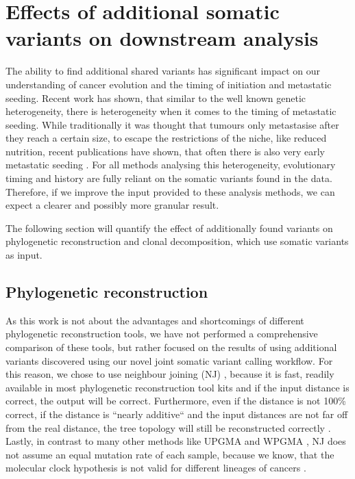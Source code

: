 \section[Effects on downstream analysis]{Effects of additional somatic variants on downstream analysis}
\label{variantcalling-sec:downstream}

The ability to find additional shared variants has significant impact on our understanding of cancer evolution and the timing of initiation and metastatic seeding. Recent work has shown, that similar to the well known genetic heterogeneity, there is heterogeneity when it comes to the timing of metastatic seeding. While traditionally it was thought that tumours only metastasise after they reach a certain size, to escape the restrictions of the niche, like reduced nutrition, recent publications have shown, that often there is also very early metastatic seeding \cite{Hu2019}. 
For all methods analysing this heterogeneity, evolutionary timing and history are fully reliant on the somatic variants found in the data. Therefore, if we improve the input provided to these analysis methods, we can expect a clearer and possibly more granular result.

The following section will quantify the effect of additionally found variants on phylogenetic reconstruction and clonal decomposition, which use somatic variants as input.


\subsection[Phylogenetic reconstruction]{Phylogenetic reconstruction}
\label{variantcalling-sec:phylo}
As this work is not about the advantages and shortcomings of different phylogenetic reconstruction tools, we have not performed a comprehensive comparison of these tools, but rather focused on the results of using additional variants discovered using our novel joint somatic variant calling workflow.  For this reason, we chose to use neighbour joining (NJ) \cite{Saitou1987}, because it is fast, readily available in most phylogenetic reconstruction tool kits and if the input distance is correct, the output will be correct. Furthermore, even if the distance is not 100\% correct, if the distance is ``nearly additive`` and the input distances are not far off from the real distance, the tree topology will still be reconstructed correctly \cite{Mihaescu2007}. Lastly, in contrast to many other methods like UPGMA and WPGMA \cite{Sokal1958}, NJ does not assume an equal mutation rate of each sample, because we know, that the molecular clock hypothesis \cite{Zuckerkandl1962} is not valid for different lineages of cancers \cite{Shibata2010}.

